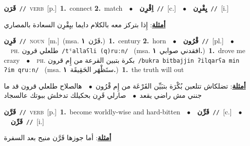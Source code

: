 \documentclass[10pt,a4paper,twoside]{article} %
\begin{document}
\begin{multicols}{2}
{\setlength\topsep{0pt}\textbf{\foreignlanguage{arabic}{قَرَن}}\ {\color{gray}\texttt{//}\color{black}}\ \textsc{verb}\ [p.]\ \textbf{1.}~connect  \textbf{2.}~match\ \ $\bullet$\ \ \setlength\topsep{0pt}\textbf{\foreignlanguage{arabic}{اِقْرِن}}\ {\color{gray}\texttt{//}\color{black}}\ [c.]\ \ $\bullet$\ \ \setlength\topsep{0pt}\textbf{\foreignlanguage{arabic}{يِقْرِن}}\ {\color{gray}\texttt{//}\color{black}}\ [i.]\  \begin{flushright}\color{gray}\foreignlanguage{arabic}{\textbf{\underline{\foreignlanguage{arabic}{أمثلة}}}: إِذا بتركز معه بالكلام دايما بيِقْرِن السعادة بالمصاري}\end{flushright}\color{black}} \vspace{2mm}

{\setlength\topsep{0pt}\textbf{\foreignlanguage{arabic}{قَرِن}}\ {\color{gray}\texttt{//}\color{black}}\ \textsc{noun}\ [m.]\ \color{gray}(msa. \foreignlanguage{arabic}{قَرْن}~\foreignlanguage{arabic}{\textbf{١.}})\color{black}\ \textbf{1.}~century  \textbf{2.}~horn\ \ $\bullet$\ \ \setlength\topsep{0pt}\textbf{\foreignlanguage{arabic}{قْرُون}}\ {\color{gray}\texttt{//}\color{black}}\ [pl.]\ \ $\bullet$\ \ \textsc{ph.} \color{gray} \foreignlanguage{arabic}{طلعلي قرون}\color{black}\ {\color{gray}\texttt{/{\sffamily tˤallaʕli (q)ruːn}/}\color{black}}\ \color{gray} (msa. \foreignlanguage{arabic}{افقدني صوابي}~\foreignlanguage{arabic}{\textbf{١.}})\color{black}\ \textbf{1.}~drove me crazy\ \ $\bullet$\ \ \textsc{ph.} \color{gray} \foreignlanguage{arabic}{بكرة بتبين القرعة من إِم قرون}\color{black}\ {\color{gray}\texttt{/{\sffamily bukra bitbajjin ʔilqarʕa min ʔim qruːn}/}\color{black}}\ \color{gray} (msa. \foreignlanguage{arabic}{ستَظْهَر الحَقِيقَة}~\foreignlanguage{arabic}{\textbf{١.}})\color{black}\ \textbf{1.}~the truth will out\  \begin{flushright}\color{gray}\foreignlanguage{arabic}{\textbf{\underline{\foreignlanguage{arabic}{أمثلة}}}: تضلكاش تتلعبن بُكْرَة بتبَيِّن القَرْعَة من إِم قْرُون\ $\bullet$\ \  هالصلاح طلعلي قرون قد ما جنني مش راضي يقعد\ $\bullet$\ \  صارلي قَرِن بحكيلك تدخلش ببوتك عالسجاد}\end{flushright}\color{black}} \vspace{2mm}

{\setlength\topsep{0pt}\textbf{\foreignlanguage{arabic}{قَرَّن}}\ {\color{gray}\texttt{//}\color{black}}\ \textsc{verb}\ [p.]\ \textbf{1.}~become worldly-wise and hard-bitten\ \ $\bullet$\ \ \setlength\topsep{0pt}\textbf{\foreignlanguage{arabic}{قَرِّن}}\ {\color{gray}\texttt{//}\color{black}}\ [c.]\ \ $\bullet$\ \ \setlength\topsep{0pt}\textbf{\foreignlanguage{arabic}{قَرِّن}}\ {\color{gray}\texttt{//}\color{black}}\ [i.]\  \begin{flushright}\color{gray}\foreignlanguage{arabic}{\textbf{\underline{\foreignlanguage{arabic}{أمثلة}}}: أما جوزها قَرَّن منيح بعد السفرة}\end{flushright}\color{black}} \vspace{2mm}


\end{multicols}
\end{document}
